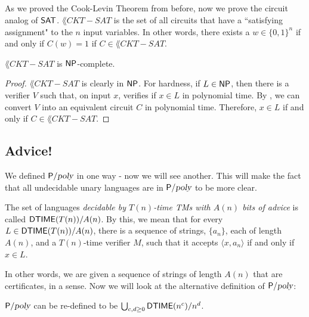 \newcommand{\CKTSAT}{}
\subsection{\CKTSAT}
As we proved the Cook-Levin Theorem from before, now we prove the circuit analog of ${\mathsf{SAT}}$. $\CKTSAT$ is the set of all circuits that have a ``satisfying assignment" to the $n$ input variables. In other words, there exists a $w \in \{0, 1\}^n$ if and only if $C(w)=1$ if $C \in \CKTSAT$.

\begin{theorem}
$\CKTSAT$ is ${\mathsf{NP}}$-complete.
\end{theorem}

\begin{proof}
$\CKTSAT$ is clearly in ${\mathsf{NP}}$. For hardness, if $L \in {\ensuremath{\mathsf{NP}}}$, then there is a verifier $V$ such that, on input $x$, verifies if $x \in L$ in polynomial time. By , we can convert $V$ into an equivalent circuit $C$ in polynomial time. Therefore, $x \in L$ if and only if $C \in \CKTSAT$.
\end{proof}

\subsection{Advice!}
We defined ${\mathsf{P}}/{\textsl{poly}}$ in one way - now we will see another. This will make the fact that all undecidable unary languages are in ${\mathsf{P}}/{\textsl{poly}}$ to be more clear. 

\begin{definition}
The set of languages \emph{decidable by $T(n)$-time TMs with $A(n)$ bits of advice} is called ${\mathsf{DTIME}}(T(n))/A(n)$. By this, we mean that for every $L \in {\ensuremath{\mathsf{DTIME}}}(T(n))/A(n)$, there is a sequence of strings, $\{a_n\}$, each of length $A(n)$, and a $T(n)$-time verifier $M$, such that it accepts $\langle x, a_n \rangle$ if and only if $x \in L$.
\end{definition}

In other words, we are given a sequence of strings of length $A(n)$ that are certificates, in a sense. Now we will look at the alternative definition of ${\mathsf{P}}/{\textsl{poly}}$:
\begin{theorem}
${\mathsf{P}}/{\textsl{poly}}$ can be re-defined to be $\bigcup_{c, d \ge 0} {\mathsf{DTIME}}(n^c)/n^d$.
\end{theorem}

